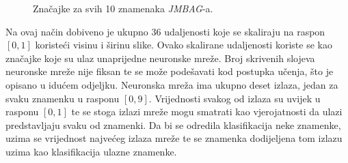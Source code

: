 \begin{figure}[htb]
    \centering
    \caption{Značajke za svih 10 znamenaka \emph{JMBAG}-a.}
    \label{fig:features-for-multiple-digits}
\end{figure}
Na ovaj način dobiveno je ukupno 36 udaljenosti koje se skaliraju na raspon $[0, 1]$ koristeći visinu i širinu slike.
Ovako skalirane udaljenosti koriste se kao značajke koje su ulaz unaprijedne neuronske mreže. Broj skrivenih slojeva
neuronske mreže nije fiksan te se može podešavati kod postupka učenja, što je opisano u idućem odjeljku. Neuronska
mreža ima ukupno deset izlaza, jedan za svaku znamenku u rasponu $[0, 9]$. Vrijednosti svakog od izlaza su uvijek u
rasponu $[0, 1]$ te se stoga izlazi mreže mogu smatrati kao vjerojatnosti da ulazi predstavljaju svaku od znamenki. Da
bi se odredila klasifikacija neke znamenke, uzima se vrijednost najvećeg izlaza mreže te se znamenka dodijeljena tom
izlazu uzima kao klasifikacija ulazne znamenke.


